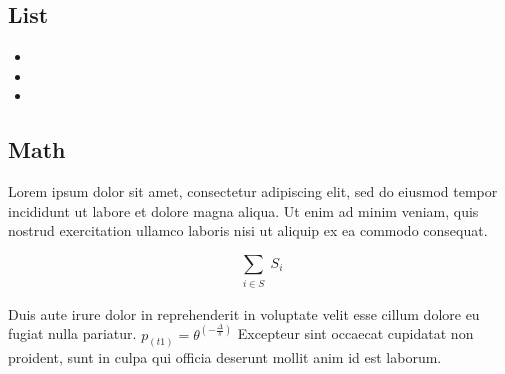 \documentclass[12pt, a4paper]{article} %
\begin{document}

\subsection{List}

\begin{itemize}

\item

\item

\item


\end{itemize}


\subsection{Math}


Lorem ipsum dolor sit amet, consectetur adipiscing elit, sed do eiusmod tempor incididunt ut labore et dolore magna aliqua. Ut enim ad minim veniam, quis nostrud exercitation ullamco laboris nisi ut aliquip ex ea commodo consequat. 

\begin{equation} %
 \sum_{\substack{ %
		 i \in S}}
	S_i
\end{equation} %

Duis aute irure dolor in reprehenderit in voluptate velit esse cillum dolore eu fugiat nulla pariatur. \(p_(t1)=\theta^(-\frac{\Delta}{s})\) %
Excepteur sint occaecat cupidatat non proident, sunt in culpa qui officia deserunt mollit anim id est laborum.

\newpage
\end{document}
